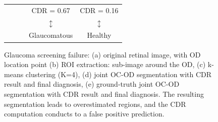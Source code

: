 \begin{figure}[t]
\begin{tabular}{|c c c c c|}
		{} & {} & {} & CDR = 0.67 & CDR = 0.16 \\
		{} & {} & {} & $\updownarrow$ & $\updownarrow$ \\
		{} & {} & {} & Glaucomatous & Healthy \\
		
		\hline
    
    \end{tabular}

	\caption{\label{glaucoma_screening_failures}Glaucoma screening failure: (a) original retinal image, with OD location point (b) ROI extraction: sub-image around the OD, (c) k-means clustering (K=4), (d) joint OC-OD segmentation with CDR result and final diagnosis, (e) ground-truth joint OC-OD segmentation with CDR result and final diagnosis. The resulting segmentation leads to overestimated regions, and the CDR computation conducts to a false positive prediction.}

\end{figure}

